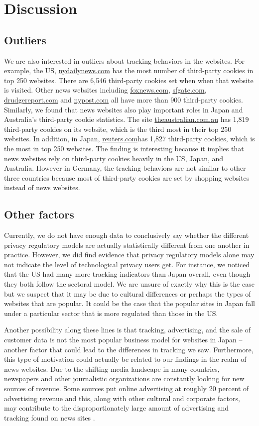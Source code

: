 \documentclass[conference]{IEEEtran}
\begin{document}
\section{Discussion}

\subsection{Outliers}
We are also interested in outliers about tracking behaviors in the websites. For example,  the US, \url{nydailynews.com} has the most number of third-party cookies in top 250 websites. There are 6,546 third-party cookies set when when that website is visited. Other news websites including \url{foxnews.com}, \url{sfgate.com}, \url{drudgereport.com} and \url{nypost.com} all have more than 900 third-party cookies. Similarly, we found that news websites also play important roles in Japan and Australia's third-party cookie statistics. The site \url{theaustralian.com.au} has 1,819 third-party cookies on its website, which is the third most in their top 250 websites. In addition, in Japan, \url{reuters.com}has 1,827 third-party cookies, which is the most in top 250 websites. The finding is interesting because it implies that news websites rely on third-party cookies heavily in the US, Japan, and Australia. However in Germany, the tracking behaviors are not similar to other three countries because most of third-party cookies are set by shopping websites instead of news websites.  

\subsection{Other factors}
Currently, we do not have enough data to conclusively say whether the different privacy regulatory models are actually statistically different from one another in practice.  However, we did find evidence that privacy regulatory models alone may not indicate the level of technological privacy users get. For instance, we noticed that the US had many more tracking indicators than Japan overall, even though they both follow the sectoral model. We are unsure of exactly why this is the case but we suspect that it may be due to cultural differences or perhaps the types of websites that are popular. It could be the case that the popular sites in Japan fall under a particular sector that is more regulated than those in the US. 

Another possibility along these lines is that tracking, advertising, and the sale of customer data is not the most popular business model for websites in Japan -- another factor that could lead to the differences in tracking we saw. Furthermore, this type of motivation could actually be related to our findings in the realm of news websites. Due to the shifting media landscape in many countries, newspapers and other journalistic organizations are constantly looking for new sources of revenue. Some sources put online advertising at roughly 20 percent of advertising revenue and this, along with other cultural and corporate factors, may contribute to the disproportionately large amount of advertising and tracking found on news sites \cite{economist}.
\end{document}
